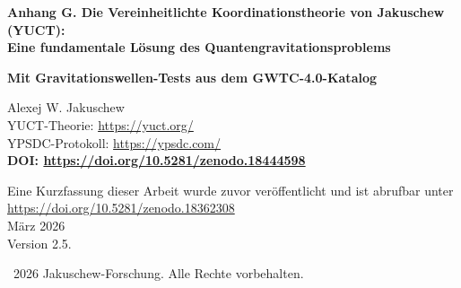 \documentclass[12pt,a4paper]{article}
\theoremstyle{remark}
\begin{document}
	
	\begin{titlepage}
		\begin{center}
			\vspace*{-0.8cm}
			
			\Huge\textbf{Anhang G. Die Vereinheitlichte Koordinationstheorie von Jakuschew (YUCT): \\ Eine fundamentale Lösung des Quantengravitationsproblems}
			
			\vspace{0.3cm}
			\Large\textbf{Mit Gravitationswellen-Tests aus dem GWTC-4.0-Katalog}
			
			\vspace{0.6cm}
			\Large
			Alexej W. Jakuschew\\
			
			YUCT-Theorie: \url{https://yuct.org/}\\
			YPSDC-Protokoll: \url{https://ypsdc.com/}\\
			
			\vspace{1.2cm}
			\textbf{DOI: \url{https://doi.org/10.5281/zenodo.18444598}}\\
			
			\vspace{0.5cm}
			
			\large 
			Eine Kurzfassung dieser Arbeit wurde zuvor veröffentlicht und ist abrufbar unter\\ \url{https://doi.org/10.5281/zenodo.18362308}\\
			\vspace{0.5cm}
			März 2026 \\ \large Version 2.5.
			
			\vspace{3.5cm}
			\textcopyright~2026 Jakuschew-Forschung. Alle Rechte vorbehalten.
			
			\newpage
			

\end{center}
\end{titlepage}
\end{document}

